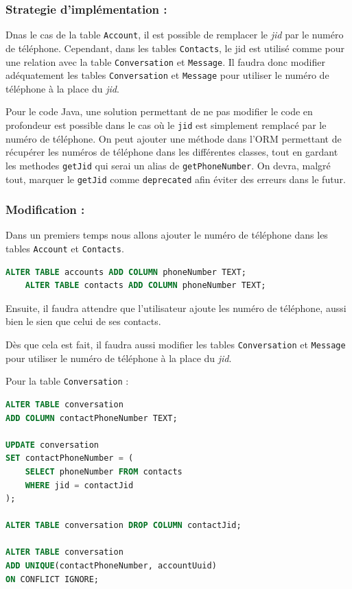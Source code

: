 \documentclass[a4paper,11pt]{article}
\begin{document}
\subsubsection*{Strategie d'implémentation :}

Dnas le cas de la table \texttt{Account}, il est possible de remplacer le \textit{jid} par le numéro de téléphone. Cependant, dans les tables \texttt{Contacts}, le jid est utilisé comme pour une relation avec la table \texttt{Conversation} et \texttt{Message}. Il faudra donc modifier adéquatement les tables \texttt{Conversation} et \texttt{Message} pour utiliser le numéro de téléphone à la place du \textit{jid}.

Pour le code Java, une solution permettant de ne pas modifier le code en profondeur est possible dans le cas où le \texttt{jid} est simplement remplacé par le numéro de téléphone. On peut ajouter une méthode dans l'ORM permettant de récupérer les numéros de téléphone dans les différentes classes, tout en gardant les methodes \texttt{getJid} qui serai un alias de \texttt{getPhoneNumber}. On devra, malgré tout, marquer le \texttt{getJid} comme \texttt{deprecated} afin éviter des erreurs dans le futur.

\subsubsection*{Modification :}

Dans un premiers temps nous allons ajouter le numéro de téléphone dans les tables \texttt{Account} et \texttt{Contacts}.

\begin{lstlisting}[language=SQL]
	ALTER TABLE accounts ADD COLUMN phoneNumber TEXT;
	ALTER TABLE contacts ADD COLUMN phoneNumber TEXT;
\end{lstlisting}

Ensuite, il faudra attendre que l'utilisateur ajoute les numéro de téléphone, aussi bien le sien que celui de ses contacts. 

Dès que cela est fait, il faudra aussi modifier les tables \texttt{Conversation} et \texttt{Message} pour utiliser le numéro de téléphone à la place du \textit{jid}.

Pour la table \texttt{Conversation} :

\begin{lstlisting}[language=SQL]
ALTER TABLE conversation 
ADD COLUMN contactPhoneNumber TEXT;

UPDATE conversation 
SET contactPhoneNumber = (
	SELECT phoneNumber FROM contacts 
	WHERE jid = contactJid
);

ALTER TABLE conversation DROP COLUMN contactJid;

ALTER TABLE conversation 
ADD UNIQUE(contactPhoneNumber, accountUuid)
ON CONFLICT IGNORE;
\end{lstlisting}
\end{document}
